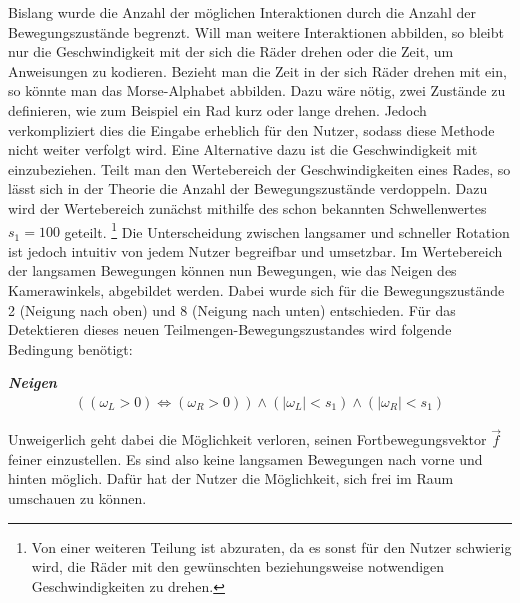 Bislang wurde die Anzahl der möglichen Interaktionen durch die Anzahl der Bewegungszustände begrenzt.
Will man weitere Interaktionen abbilden, so bleibt nur die Geschwindigkeit mit der sich die Räder drehen oder die Zeit, um Anweisungen zu kodieren.
Bezieht man die Zeit in der sich Räder drehen mit ein, so könnte man das Morse-Alphabet abbilden.
Dazu wäre nötig, zwei Zustände zu definieren, wie zum Beispiel ein Rad kurz oder lange drehen.
Jedoch verkompliziert dies die Eingabe erheblich für den Nutzer, sodass diese Methode nicht weiter verfolgt wird.
Eine Alternative dazu ist die Geschwindigkeit mit einzubeziehen.
Teilt man den Wertebereich der Geschwindigkeiten eines Rades, so lässt sich in der Theorie die Anzahl der Bewegungszustände verdoppeln.
Dazu wird der Wertebereich zunächst mithilfe des schon bekannten Schwellenwertes $s_1=100$ geteilt.
\footnote{Von einer weiteren Teilung ist abzuraten, da es sonst für den Nutzer schwierig wird, die Räder mit den gewünschten beziehungsweise notwendigen Geschwindigkeiten zu drehen.}
Die Unterscheidung zwischen langsamer und schneller Rotation ist jedoch intuitiv von jedem Nutzer begreifbar und umsetzbar.
Im Wertebereich der langsamen Bewegungen können nun Bewegungen, wie das Neigen des Kamerawinkels, abgebildet werden.
Dabei wurde sich für die Bewegungszustände 2 (Neigung nach oben) und 8 (Neigung nach unten) entschieden.
Für das Detektieren dieses neuen Teilmengen-Bewegungszustandes wird folgende Bedingung benötigt:

\textbf{\textit{Neigen}}
\begin{align}
    ((\omega_L > 0) \Leftrightarrow (\omega_R > 0))  \land (|\omega_L| < s_1) \land (|\omega_R| < s_1)
\end{align}

Unweigerlich geht dabei die Möglichkeit verloren, seinen Fortbewegungsvektor $\vec{f}$ feiner einzustellen.
Es sind also keine langsamen Bewegungen nach vorne und hinten möglich.
Dafür hat der Nutzer die Möglichkeit, sich frei im Raum umschauen zu können.

